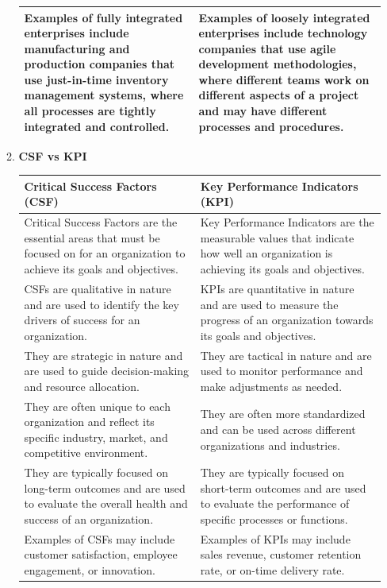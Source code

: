 \documentclass[12pt]{article}
\begin{document}
\begin{enumerate}
\begin{enumerate}
\begin{longtable}{|p{6cm}|p{6cm}|}
                \hline
                Examples of fully integrated enterprises include manufacturing and production companies that use just-in-time inventory management systems, where all processes are tightly integrated and controlled. & Examples of loosely integrated enterprises include technology companies that use agile development methodologies, where different teams work on different aspects of a project and may have different processes and procedures. \\
                \hline
        \end{longtable}
        \item {\bfseries CSF vs KPI}
        \begin{longtable}{|p{6cm}|p{6cm}|}
            \hline
            \textbf{Critical Success Factors (CSF)} & \textbf{Key Performance Indicators (KPI)} \\
            \hline
            Critical Success Factors are the essential areas that must be focused on for an organization to achieve its goals and objectives. & Key Performance Indicators are the measurable values that indicate how well an organization is achieving its goals and objectives. \\
            \hline
            CSFs are qualitative in nature and are used to identify the key drivers of success for an organization. & KPIs are quantitative in nature and are used to measure the progress of an organization towards its goals and objectives. \\
            \hline
            They are strategic in nature and are used to guide decision-making and resource allocation. & They are tactical in nature and are used to monitor performance and make adjustments as needed. \\
            \hline
            They are often unique to each organization and reflect its specific industry, market, and competitive environment. & They are often more standardized and can be used across different organizations and industries. \\
            \hline
            They are typically focused on long-term outcomes and are used to evaluate the overall health and success of an organization. & They are typically focused on short-term outcomes and are used to evaluate the performance of specific processes or functions. \\
            \hline
            Examples of CSFs may include customer satisfaction, employee engagement, or innovation. & Examples of KPIs may include sales revenue, customer retention rate, or on-time delivery rate. \\

\end{longtable}
\end{enumerate}
\end{enumerate}
\end{document}

